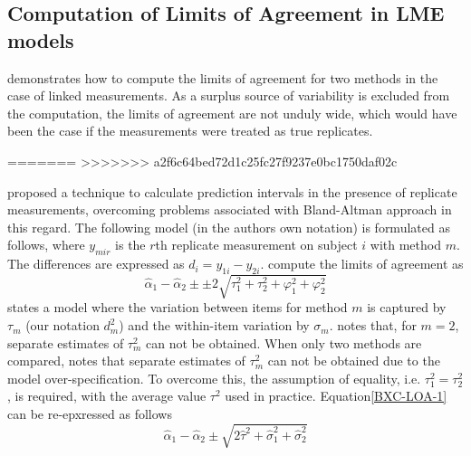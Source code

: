 \documentclass[12pt, a4paper]{report}
\theoremstyle{plain}
\theoremstyle{definition}
\theoremstyle{remark}
\begin{document}
	\subsection{Computation of Limits of Agreement in LME models}
	
	
\citet{BXC2008} demonstrates how to compute the limits of agreement for two methods in the case of linked measurements. As a surplus source of variability is excluded from the computation, the limits of agreement are not unduly wide, which would have been the case if the measurements were treated as true replicates.








	
=======
>>>>>>> a2f6c64bed72d1c25fc27f9237e0bc1750daf02c

\citet{BXC2008} proposed a technique to calculate prediction intervals in the presence of replicate measurements, overcoming problems associated with Bland-Altman approach in this regard. The following model (in the authors own notation) is
formulated as follows, where $y_{mir}$ is the $r$th replicate
measurement on subject $i$ with method $m$. The differences are expressed as $d_{i} = y_{1i} - y_{2i}$. \citet{BXC2008} compute the limits of agreement as
\begin{equation}
\hat{\alpha}_1 - \hat{\alpha}_2 \pm \pm 2 \sqrt{ \tau^2_1 +  \tau^2_2 +  \varphi^2_1 +  \varphi^2_2 }
\label{BXC-LOA-1}
\end{equation}
\citet{BXC2008} states a model where the variation between items for method $m$ is captured by $\tau_m$ (our notation $d^2_m$) and the within-item variation by $\sigma_m$. \citet{BXC2008} notes that, for $m=2$, separate estimates of $\tau^2_m$ can not be obtained.  When only two methods are compared, \citet{BXC2008} notes that separate estimates of $\tau^2_m$ can not be obtained due to the model over-specification. To overcome this, the assumption of equality, i.e. $\tau^2_1 = \tau^2_2$, is required, with the average value $\tau^2$ used in practice. Equation\ref{BXC-LOA-1} can be re-epxressed as follows
\begin{equation}
\hat{\alpha}_1 - \hat{\alpha}_2 \pm \sqrt{2 \hat{\tau}^2 + \hat{\sigma}^2_1 + \hat{\sigma}^2_2}
\end{equation}
\end{document}
